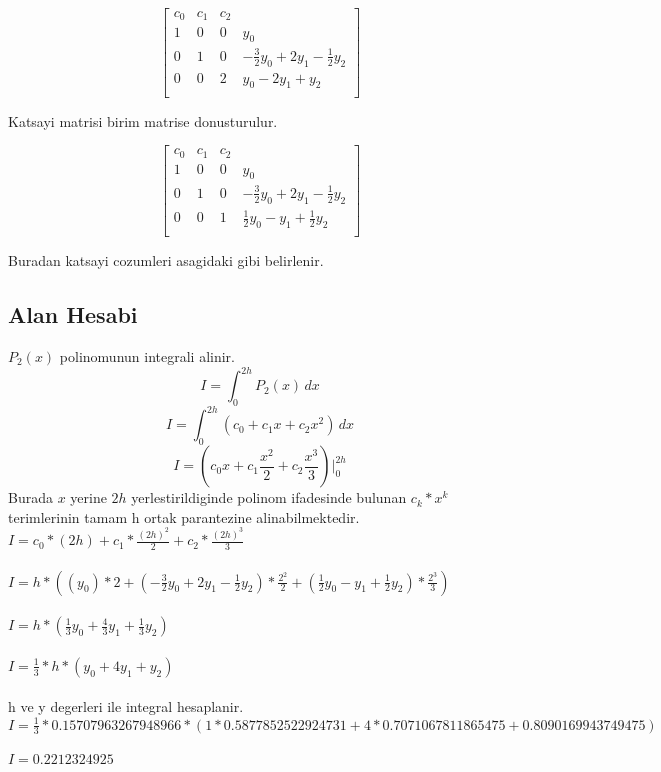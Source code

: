 \documentclass{article}
\begin{document}
\begin{center}
$$ \left[\begin{array}{rrr|r}
c_{0} & c_{1} & c_{2}\\
1 & 0 & 0 & y_{0}\\
0 & 1 & 0 & -\frac{3}{2}y_{0}+2y_{1}-\frac{1}{2}y_{2}\\
0 & 0 & 2 & y_{0}-2y_{1}+y_{2}\\
\end{array}\right] $$
\end{center}
Katsayi matrisi birim matrise donusturulur.
\begin{center}
$$ \left[\begin{array}{rrr|r}
c_{0} & c_{1} & c_{2}\\
1 & 0 & 0 & y_{0}\\
0 & 1 & 0 & -\frac{3}{2}y_{0}+2y_{1}-\frac{1}{2}y_{2}\\
0 & 0 & 1 & \frac{1}{2}y_{0}-y_{1}+\frac{1}{2}y_{2}\\
\end{array}\right] $$
\end{center}
Buradan katsayi cozumleri asagidaki gibi belirlenir.\\
\subsection{Alan Hesabi}
$P_{2}(x)$ polinomunun integrali alinir.\\
\[ I=\int_{0}^{2h} P_{2}(x) \,dx \]
\[ I=\int_{0}^{2h} (c_{0}+c_{1}x+c_{2}x^{2}) \,dx \]
\[ I=(c_{0}x+c_{1}\frac{x^{2}}{2}+c_{2}\frac{x^{3}}{3})\bigg\vert_{0}^{2h} \]
Burada $x$ yerine $2h$ yerlestirildiginde polinom ifadesinde bulunan $c_{k}*x^{k}$ terimlerinin tamam h ortak parantezine alinabilmektedir.\\
$\displaystyle I=c_{0}*(2h)+c_{1}*\frac{(2h)^{2}}{2}+c_{2}*\frac{(2h)^{3}}{3}$\\\\
$\displaystyle I=h*((y_{0})*2+(-\frac{3}{2}y_{0}+2y_{1}-\frac{1}{2}y_{2})*\frac{2^{2}}{2}+(\frac{1}{2}y_{0}-y_{1}+\frac{1}{2}y_{2})*\frac{2^{3}}{3})$\\\\
$\displaystyle I=h*(\frac{1}{3}y_{0}+\frac{4}{3}y_{1}+\frac{1}{3}y_{2})$\\\\
$\displaystyle I=\frac{1}{3}*h*(y_{0}+4y_{1}+y_{2})$\\\\
h ve y degerleri ile integral hesaplanir.\\
$\displaystyle I=\frac{1}{3}*0.15707963267948966*(1*0.5877852522924731+4*0.7071067811865475+0.8090169943749475)$\\\\
$\displaystyle I=0.2212324925$\\\\
\end{document}
